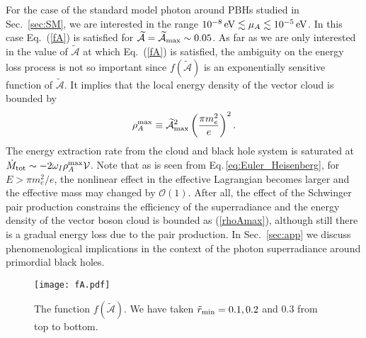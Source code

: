 \documentclass[%
 preprint,
 nofootinbib,
 amsmath,amssymb,
 aps,
 a4paper
]{revtex4-1}
\begin{document}
For the case of the standard model photon around PBHs studied in Sec.~\ref{sec:SM}, we are interested in the range $10^{-8}\,{\rm eV}\lesssim \mu_A \lesssim 10^{-5}\,{\rm eV}$.
In this case Eq.~(\ref{fA}) is satisfied for $\widetilde{\mathcal A}=\widetilde{\mathcal A}_{\rm max} \sim 0.05$.
As far as we are only interested in the value of $\widetilde{\mathcal A}$ at which Eq.~(\ref{fA}) is satisfied, the ambiguity on the energy loss process is not so important since $f(\widetilde{\mathcal A})$ is an exponentially sensitive function of $\widetilde{\mathcal A}$.
It implies that the local energy density of the vector cloud is bounded by
\begin{align}
    \rho_A^{\rm max} \equiv \widetilde{\mathcal A}_{\rm max}^2\left(\frac{\pi m_e^2}{e}\right)^2.  \label{rhoAmax}
\end{align}
The energy extraction rate from the cloud and black hole system is saturated at $\dot M_{\rm tot} \sim - 2\omega_I \rho_{A}^{\rm max} \mathcal V$.
Note that as is seen from Eq.\,\eqref{eq:Euler_Heisenberg}, for $E > \pi m_e^2 / e$, the nonlinear effect in the effective Lagrangian becomes larger and the effective mass may changed by $\mathcal O(1)$.
After all, the effect of the Schwinger pair production constrains the efficiency of the superradiance and the energy density of the vector boson cloud is bounded as (\ref{rhoAmax}), although still there is a gradual energy loss due to the pair production. %
In Sec.~\ref{sec:app} we discuss phenomenological implications in the context of the photon superradiance around primordial black holes.


\begin{figure}[ht]
\begin{center}
\texttt{[image: fA.pdf]}
\end{center}
\caption{
 The function $f(\widetilde{\mathcal A})$. We have taken $\tilde r_{\rm min}=0.1,0.2$ and $0.3$ from top to bottom.
}
\label{fig:fA}
\end{figure}
\end{document}
